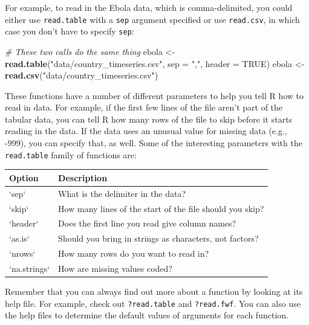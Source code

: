 \documentclass[]{book}
\makeatletter
\newenvironment{Shaded}{\begin{snugshade}}{\end{snugshade}}
\newcommand{\KeywordTok}[1]{\textcolor[rgb]{0.13,0.29,0.53}{\textbf{#1}}}
\newcommand{\DataTypeTok}[1]{\textcolor[rgb]{0.13,0.29,0.53}{#1}}
\newcommand{\StringTok}[1]{\textcolor[rgb]{0.31,0.60,0.02}{#1}}
\newcommand{\CommentTok}[1]{\textcolor[rgb]{0.56,0.35,0.01}{\textit{#1}}}
\newcommand{\OtherTok}[1]{\textcolor[rgb]{0.56,0.35,0.01}{#1}}
\newcommand{\NormalTok}[1]{#1}
\newenvironment{kframe}{%
\medskip{}
\setlength{\fboxsep}{.8em}
 \def\at@end@of@kframe{}%
 \ifinner\ifhmode%
  \def\at@end@of@kframe{\end{minipage}}%
  \begin{minipage}{\columnwidth}%
 \fi\fi%
 \def\FrameCommand##1{\hskip\@totalleftmargin \hskip-\fboxsep
 \colorbox{shadecolor}{##1}\hskip-\fboxsep
     \hskip-\linewidth \hskip-\@totalleftmargin \hskip\columnwidth}%
 \MakeFramed {\advance\hsize-\width
   \@totalleftmargin\z@ \linewidth\hsize
   \@setminipage}}%
 {\par\unskip\endMakeFramed%
 \at@end@of@kframe}
\renewenvironment{Shaded}{\begin{kframe}}{\end{kframe}}
\newenvironment{rmdblock}[1]
  {
  \begin{itemize}
  \renewcommand{\labelitemi}{
    \raisebox{-.7\height}[0pt][0pt]{
      {\setkeys{Gin}{width=3em,keepaspectratio}\texttt{[image: images/\#1]}}
    }
  }
  \setlength{\fboxsep}{1em}
  \begin{kframe}
  \item
  }
  {
  \end{kframe}
  \end{itemize}
  }
\newenvironment{rmdnote}
  {\begin{rmdblock}{note}}
  {\end{rmdblock}}
\theoremstyle{definition}
\theoremstyle{definition}
\theoremstyle{definition}
\theoremstyle{remark}
\makeatother
\begin{document}
For example, to read in the Ebola data, which is comma-delimited, you
could either use \texttt{read.table} with a \texttt{sep} argument
specified or use \texttt{read.csv}, in which case you don't have to
specify \texttt{sep}:

\begin{Shaded}
\begin{Highlighting}[]
\CommentTok{# These two calls do the same thing}
\NormalTok{ebola <-}\StringTok{ }\KeywordTok{read.table}\NormalTok{(}\StringTok{"data/country_timeseries.csv"}\NormalTok{, }\DataTypeTok{sep =} \StringTok{","}\NormalTok{,}
                    \DataTypeTok{header =} \OtherTok{TRUE}\NormalTok{)}
\NormalTok{ebola <-}\StringTok{ }\KeywordTok{read.csv}\NormalTok{(}\StringTok{"data/country_timeseries.csv"}\NormalTok{)}
\end{Highlighting}
\end{Shaded}

These functions have a number of different parameters to help you tell R
how to read in data. For example, if the first few lines of the file
aren't part of the tabular data, you can tell R how many rows of the
file to skip before it starts reading in the data. If the data uses an
unusual value for missing data (e.g., -999), you can specify that, as
well. Some of the interesting parameters with the \texttt{read.table}
family of functions are:

\begin{tabular}{l|l}
\hline
Option & Description\\
\hline
`sep` & What is the delimiter in the data?\\
\hline
`skip` & How many lines of the start of the file should you skip?\\
\hline
`header` & Does the first line you read give column names?\\
\hline
`as.is` & Should you bring in strings as characters, not factors?\\
\hline
`nrows` & How many rows do you want to read in?\\
\hline
`na.strings` & How are missing values coded?\\
\hline
\end{tabular}

\begin{rmdnote}
Remember that you can always find out more about a function by looking
at its help file. For example, check out \texttt{?read.table} and
\texttt{?read.fwf}. You can also use the help files to determine the
default values of arguments for each function.
\end{rmdnote}
\end{document}
